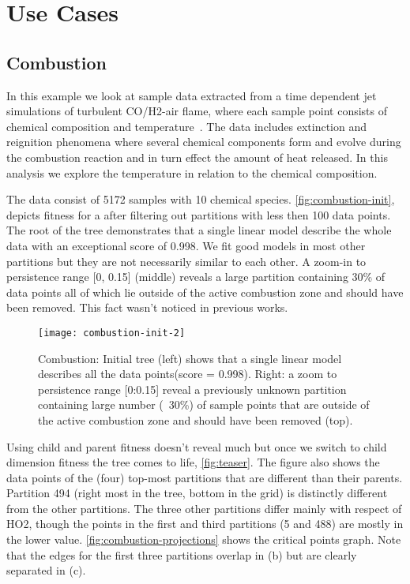 \vspace{-.1in}
\section{Use Cases}
\label{sec:use_cases}

\subsection{Combustion}
\label{sec:combustion}
In this example we look at sample data extracted from a time dependent jet simulations of turbulent CO/H2-air flame, where each sample point consists of chemical composition and temperature~\cite{hawkes07}. The data includes extinction and reignition phenomena where several chemical components form and evolve during the combustion reaction and in turn effect the amount of heat released. In this analysis we explore the temperature in relation to the chemical composition. 

The data consist of 5172 samples with 10 chemical species. \autoref{fig:combustion-init}, depicts fitness for a \RT after filtering out partitions with less then 100 data points. The root of the tree demonstrates that a single linear model describe the whole data with an exceptional score of 0.998. We fit good models in most other partitions but they are not necessarily similar to each other. A zoom-in to persistence range [0, 0.15] (middle) reveals a large partition containing 30\% of data points all of which lie outside of the active combustion zone and should have been removed. This fact wasn't noticed in previous works. 

\begin{figure}[b]
    \begin{center}
     \texttt{[image: combustion-init-2]}
     \vspace{-.2in}
    \caption{Combustion: Initial tree (left) shows that a single linear model describes all the data points(score = 0.998). Right: a zoom to persistence range [0:0.15] reveal a previously unknown partition containing large number (~30\%) of sample points that are outside of the active combustion zone and should have been removed (top).}
    \label{fig:combustion-init}
    \end{center}
         \vspace{-.1in}
\end{figure}

Using child and parent fitness doesn't reveal much but once we switch to child dimension fitness the tree comes to life, \autoref{fig:teaser}. The figure also shows the data points of the (four) top-most partitions that are different than their parents. Partition 494 (right most in the tree, bottom in the grid) is distinctly different from the other partitions. The three other partitions  differ mainly with respect of HO2, though the points in the first and third partitions (5 and 488) are mostly in the lower value. \autoref{fig:combustion-projections} shows the critical points graph. Note that the edges for the first three partitions overlap in (b) but are clearly separated in (c). 

